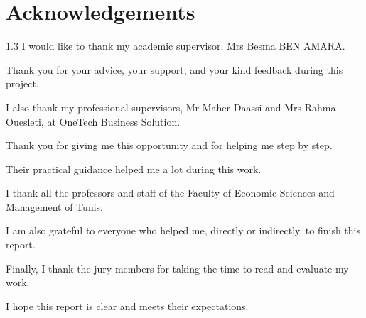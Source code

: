 \chapter*{Acknowledgements}
\mtcaddchapter

\begin{center}
\begin{spacing}{1.3}
I would like to thank my academic supervisor, Mrs Besma BEN AMARA.\par
Thank you for your advice, your support, and your kind feedback during this project.\par
\vspace{0.4em}
I also thank my professional supervisors, Mr Maher Daassi and Mrs Rahma Ouesleti, at OneTech Business Solution.\par
Thank you for giving me this opportunity and for helping me step by step.\par
Their practical guidance helped me a lot during this work.\par
\vspace{0.4em}
I thank all the professors and staff of the Faculty of Economic Sciences and Management of Tunis.\par
I am also grateful to everyone who helped me, directly or indirectly, to finish this report.\par
\vspace{0.4em}
Finally, I thank the jury members for taking the time to read and evaluate my work.\par
I hope this report is clear and meets their expectations.
\end{spacing}
\end{center}



\newpage
\tableofcontents
{}
\mtcaddchapter
\clearpage

\newpage
{}
{}
\listoffigures
\mtcaddchapter
\clearpage

\newpage
{}
{}
\listoftables
\mtcaddchapter
\clearpage
\hypersetup{pageanchor=true}


